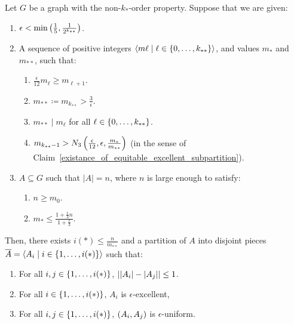     \lemma[Corollary 5.15]\label{resume_of_all_conditions_for_excellent_partitions}
        Let $G$ be a graph with the non-$k_{*}$-order property.
        Suppose that we are given:
        \begin{enumerate}
            \item $\epsilon < \min \left( \frac{1}{5}, \frac{1}{2^{k_{**}}} \right)$.
            \item A sequence of positive integers $\left< m\ell \mid \ell \in \left\{ 0, \dots, k_{**} \right\} \right>$, and values $m_*$
                and $m_{**}$, such that:
                \begin{enumerate}[label=(\alph*), ref=2.\alph*]
                    \item \label{itm:5.15.a} $\frac{\epsilon}{12} m_\ell \geq m_{\ell + 1}$.
                    \item \label{itm:5.15.b} $m_{**} \coloneq m_{k_{**}} > \frac{3}{\epsilon}$.
                    \item \label{itm:5.15.c} $m_{**} \mid m_\ell$ for all $\ell \in \left\{ 0, \dots, k_{**} \right\}$.
                    \item \label{itm:5.15.d} $m_{k_{**}-1} > N_3\left( \frac{\epsilon}{12}, \epsilon, \frac{m_*}{m_{**}} \right)$ (in the sense
                        of Claim~\ref{existance_of_equitable_excellent_subpartition}).
            \end{enumerate}
            \item $A \subseteq G$ such that $|A| = n$, where $n$ is large enough to satisfy:
            \begin{enumerate}[label=(\alph*'), ref=3.\alph*]
                \item \label{itm:5.15.a'} $n \geq m_0$. 
                \item \label{itm:5.15.b'} $m_* \leq \frac{1 + \frac{\epsilon}{3}n}{1 + \frac{\epsilon}{3}}$.
            \end{enumerate}
        \end{enumerate}
        Then, there exists $i(*) \leq \frac{n}{m_{**}}$ and a partition of $A$ into disjoint pieces
        $\overline{A} = \left< A_i \mid i \in \left\{ 1, \dots, i(*) \right\} \right>$ such that:
        \begin{enumerate}[label=(\roman*), ref=\roman*]
            \item \label{itm:5.15.i} For all $i, j \in \left\{ 1, \dots, i(*) \right\}$, $\left| \left| A_i \right|- \left| A_j \right| \right| \leq 1$.
            \item \label{itm:5.15.ii} For all $i \in \left\{ 1, \dots, i(*) \right\}$, $A_i$ is $\epsilon$-excellent,
            \item \label{itm:5.15.iii} For all $i, j \in \left\{ 1, \dots, i(*) \right\}$, $\left( A_i, A_j \right)$ is $\epsilon$-uniform.
        \end{enumerate}
